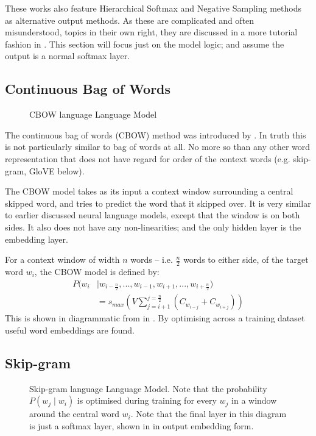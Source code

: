 \documentclass[parskip]{komatufte}
\begin{document}

These works also feature Hierarchical Softmax and Negative Sampling methods as alternative output methods.
As these are complicated and often misunderstood, topics in their own right, they are discussed in a more tutorial fashion in .
This section will focus just on the model logic; and assume the output is a normal softmax layer.

\subsection{Continuous Bag of Words}\label{sec:cbow}
\begin{figure}
	\caption{CBOW language Language Model}
	\label{fig:cbow}
	\centering
	 
\end{figure}

The continuous bag of words (CBOW) method was introduced by .
In truth this is not particularly similar to bag of words at all.
No more so than any other word representation that does not have regard for order of the context words (e.g. skip-gram, GloVE below).

The CBOW model takes as its input a context window surrounding a central skipped word, and tries to predict the word that it skipped over.
It is very similar to earlier discussed neural language models, except that the window is on both sides.
It also does not have any non-linearities;
and the only hidden layer is the embedding layer.

For a context window of width $n$ words -- i.e. $\frac{n}{2}$ words to either side, of the target word $w_i$,
the CBOW model is defined by:
\begin{align}
P(w_i & \mid w_{i-\frac{n}{2}},..., w_{i-1}, w_{i+1},...,w_{i+\frac{n}{2}})  \nonumber
\\  & = s_{max}(V \sum_{j=i+1}^{j=\frac{n}{2}} \left( C_{w_{i-j}}+C_{w_{i+j}} \right))
\end{align}
This is shown in diagrammatic from in \label{fig:cbow}.
By optimising across a training dataset
useful word embeddings are found.


\subsection{Skip-gram}\label{sec:skip-gram}
\begin{figure}
	\caption{\label{fig:skip-gram} Skip-gram language Language Model. Note that the probability $P(w_j \mid w_i)$ is optimised during training for every $w_j$ in a window around the central word $w_i$.
	Note that the final layer in this diagram is just a softmax layer, shown in in output embedding form.
	}
	\centering
	 
\end{figure}
\end{document}
